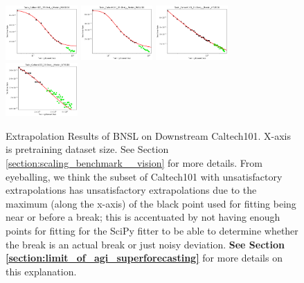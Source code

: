 \documentclass{article} %
\begin{document}
\begin{figure}
\includegraphics[width=0.245\textwidth]{figures/scaling_laws_benchmark_dataset_plots/caltech_25shot___MiX_B_16.png}
\includegraphics[width=0.245\textwidth]{figures/scaling_laws_benchmark_dataset_plots/caltech_25shot___MiX_L_16.png}
\includegraphics[width=0.245\textwidth]{figures/scaling_laws_benchmark_dataset_plots/caltech_25shot___ViT_B_16.png}
\includegraphics[width=0.245\textwidth]{figures/scaling_laws_benchmark_dataset_plots/caltech_25shot___ViT_S_16.png}

    \caption{
    Extrapolation Results of BNSL on Downstream Caltech101. X-axis is pretraining dataset size. See Section \ref{section:scaling_benchmark__vision} for more details. From eyeballing, we think the subset of Caltech101 with unsatisfactory extrapolations has unsatisfactory extrapolations due to the maximum (along the x-axis) of the black point used for fitting being near or before a break; this is accentuated by not having enough points for fitting for the SciPy fitter to be able to determine whether the break is an actual break or just noisy deviation. \textbf{See Section \ref{section:limit_of_agi_superforecasting}} for more details on this explanation.
    }
    \label{fig:scaling_laws_benchmark_dataset__caltech}
\end{figure}

\clearpage

\end{document}
